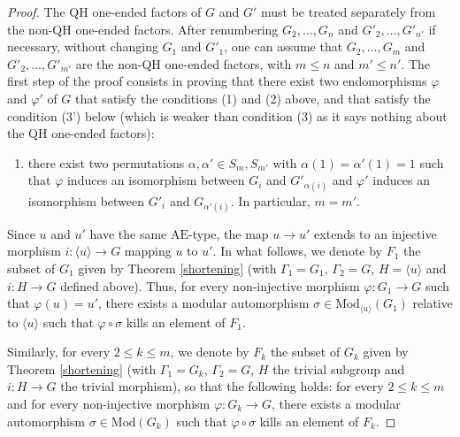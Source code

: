 \documentclass[a4paper, 11pt]{amsart}
\theoremstyle{definition}
\theoremstyle{remark}
\renewcommand{\leq}{\leqslant}
\begin{document}
\begin{proof}The QH one-ended factors of $G$ and $G'$ must be treated separately from the non-QH one-ended factors. After renumbering $G_2,\ldots,G_n$ and $G'_2,\ldots,G'_{n'}$ if necessary, without changing $G_1$ and $G'_1$, one can assume that $G_2,\ldots,G_m$ and $G'_2,\ldots,G'_{m'}$ are the non-QH one-ended factors, with $m\leq n$ and $m'\leq n'$. The first step of the proof consists in proving that there exist two endomorphisms $\varphi$  and $\varphi'$ of $G$ that satisfy the conditions (1) and (2) above, and that satisfy the condition (3') below (which is weaker than condition (3) as it says nothing about the QH one-ended factors):

\begin{enumerate}[(3')]
    \item[(3')] there exist two permutations $\alpha,\alpha'\in S_m,S_{m'}$ with $\alpha(1)=\alpha'(1)=1$ such that $\varphi$ induces an isomorphism between $G_i$ and $G'_{\alpha(i)}$ and $\varphi'$ induces an isomorphism between $G'_i$ and $G_{\alpha'(i)}$. In particular, $m=m'$.
\end{enumerate}


\smallskip \noindent
 Since $u$ and $u'$ have the same $\mathrm{AE}$-type, the map $u\rightarrow u'$ extends to an injective morphism $i : \langle u\rangle\rightarrow G$ mapping $u$ to $u'$. In what follows, we denote by $F_1$ the subset of $G_1$ given by Theorem \ref{shortening} (with $\Gamma_1=G_1$, $\Gamma_2=G$, $H=\langle u\rangle$ and $i:H\rightarrow G$ defined above). Thus, for every non-injective morphism $\varphi: G_1\rightarrow G$ such that $\varphi(u)=u'$, there exists a modular automorphism $\sigma\in\mathrm{Mod}_{\langle u\rangle}(G_1)$ relative to $\langle u\rangle$ such that $\varphi\circ\sigma$ kills an element of $F_1$. 

\smallskip \noindent
Similarly, for every $2\leq k\leq m$, we denote by $F_k$ the subset of $G_k$ given by Theorem \ref{shortening} (with $\Gamma_1=G_k$, $\Gamma_2=G$, $H$ the trivial subgroup and $i:H\rightarrow G$ the trivial morphism), so that the following holds: for every $2\leq k\leq m$ and for every non-injective morphism $\varphi: G_k\rightarrow G$, there exists a modular automorphism $\sigma\in\mathrm{Mod}(G_k)$ such that $\varphi\circ\sigma$ kills an element of $F_k$. 


\end{proof}
\end{document}
